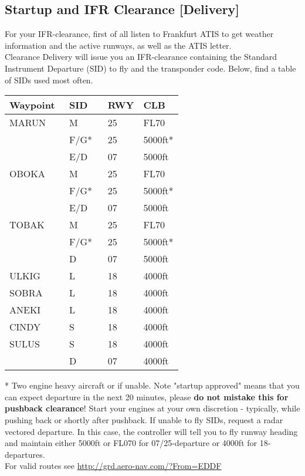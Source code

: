 \subsection[DEL]{Startup and IFR Clearance [Delivery]}
For your IFR-clearance, first of all listen to Frankfurt ATIS to
get weather information and the active runways, as well as
the ATIS letter.\\
Clearance Delivery will issue you an IFR-clearance containing the Standard Instrument Departure (SID) to fly and the transponder code. Below, find a table of SIDs used most often.
\begin{table}[h]
	\begin{tabular}{|l|l|l|l|}
		\hline
		\textbf{Waypoint} & \textbf{SID}  & \textbf{RWY} & \textbf{CLB}\\\hline
		MARUN    & M 		& 25 & FL70			\\
				 & F/G*		& 25 & 5000ft* 		\\
				 & E/D		& 07 & 5000ft   	\\\hline
		OBOKA    & M 		& 25 & FL70			\\
				 & F/G*		& 25 & 5000ft* 		\\
				 & E/D		& 07 & 5000ft   	\\\hline
		TOBAK    & M    	& 25 & FL70	\\
				 & F/G*		& 25 & 5000ft* \\
				 & D		& 07 & 5000ft   	\\\hline
		ULKIG    & L   		& 18 & 4000ft 		\\\hline
		SOBRA    & L    	& 18 & 4000ft 		\\\hline
		ANEKI    & L    	& 18 & 4000ft 		\\\hline
		CINDY    & S    	& 18 & 4000ft 		\\\hline
		SULUS    & S    	& 18 & 4000ft  		\\
				 & D    	& 07 & 4000ft 		\\
		\hline
	\end{tabular}
\end{table}

* Two engine heavy aircraft or if unable.\newpage
Note "startup approved" means that you can expect departure in the next 20 minutes, please \textbf{do not mistake this for pushback clearance}! Start your engines at your own discretion - typically, while pushing back or shortly after
pushback.
If unable to fly SIDs, request a radar vectored departure. In this case, the controller will tell you to fly runway heading and maintain either 5000ft or FL070 for 07/25-departure or 4000ft for 18-departures.\\
For valid routes see \url{http://grd.aero-nav.com/?From=EDDF}

